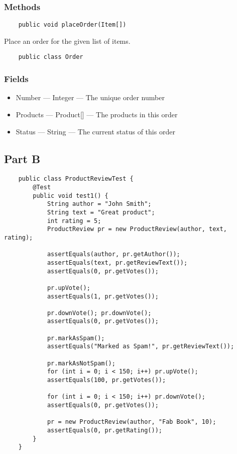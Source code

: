 \documentclass[a4paper]{report}
\begin{document}
\subsubsection{Methods}
\begin{lstlisting}
    public void placeOrder(Item[])
\end{lstlisting}

Place an order for the given list of items.


\begin{lstlisting}
    public class Order
\end{lstlisting}

\subsubsection{Fields}
\begin{itemize}
    \item Number --- Integer --- The unique order number
    \item Products --- Product[] --- The products in this order
    \item Status --- String --- The current status of this order
\end{itemize}


\subsection{Part B}
\begin{lstlisting}
    public class ProductReviewTest {
        @Test
        public void test1() {
            String author = "John Smith";
            String text = "Great product";
            int rating = 5;
            ProductReview pr = new ProductReview(author, text, rating);

            assertEquals(author, pr.getAuthor());
            assertEquals(text, pr.getReviewText());
            assertEquals(0, pr.getVotes());

            pr.upVote();
            assertEquals(1, pr.getVotes());

            pr.downVote(); pr.downVote();
            assertEquals(0, pr.getVotes());

            pr.markAsSpam();
            assertEquals("Marked as Spam!", pr.getReviewText());
            
            pr.markAsNotSpam();
            for (int i = 0; i < 150; i++) pr.upVote();
            assertEquals(100, pr.getVotes());

            for (int i = 0; i < 150; i++) pr.downVote();
            assertEquals(0, pr.getVotes());

            pr = new ProductReview(author, "Fab Book", 10);
            assertEquals(0, pr.getRating());
        }
    }
\end{lstlisting}
\end{document}
